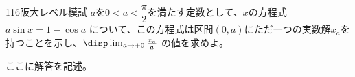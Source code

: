 \begin{prob}{116}{}{阪大レベル模試}
 $a$を$0<a<\dfrac{\pi}{2}$を満たす定数として、$x$の方程式 $a\sin x = 1-\cos a$ について、この方程式は区間$(0,a)$にただ一つの実数解$x_a$を持つことを示し、$\disp \lim_{a\to +0} \frac{x_a}{a}$ の値を求めよ。
\end{prob}
ここに解答を記述。